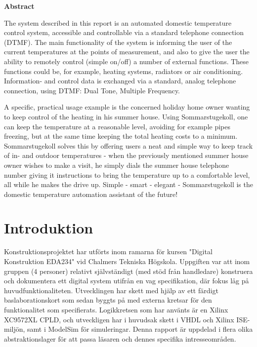 \documentclass[a4paper,11pt]{article}
\begin{document}
\begin{center}
	{\noindent \bf Abstract}
\end{center}

	The system described in this report is an automated domestic temperature control system, accessible and controllable via
	a standard telephone connection (DTMF). The main functionality of the system is informing the user of the current temperatures
	at the points of measurement, and also to give the user the ability to remotely control (simple on/off) a number of external
	functions. These functions could be, for example, heating systems, radiators or air conditioning. Information- and control data
	is exchanged via a standard, analog telephone connection, using DTMF: Dual Tone, Multiple Frequency.

	A specific, practical usage example is the concerned holiday home owner wanting to keep control of the heating in his summer house.
	Using Sommarstugekoll, one can keep the temperature at a reasonable level, avoiding for example pipes freezing, but at the same time
	keeping the total heating costs to a minimum. Sommarstugekoll solves this by offering users a neat and simple way to keep track
	of in- and outdoor temperatures - when the previously mentioned summer house owner wishes to make a visit, he simply dials the
	summer house telephone number giving it instructions to bring the temperature up to a comfortable level, all while he makes
	the drive up. Simple - smart - elegant - Sommarstugekoll is the domestic temperature automation assistant of the future!

\pagebreak

\section{Introduktion}

	Konstruktionsprojektet har utförts inom ramarna för kursen "Digital Konstruktion EDA234" vid Chalmers Tekniska Högskola.
	Uppgiften var att inom gruppen (4 personer) relativt självständigt (med stöd från handledare) konstruera och dokumentera
	ett digital system utifrån en vag specifikation, där fokus låg på huvudfunktionaliteten.
	Utvecklingen har skett med hjälp av ett färdigt baslaborationskort som sedan byggts på med externa kretsar för den funktionalitet
	som specifierats. Logikkretsen som har använts är en Xilinx XC9572XL CPLD, och utveckligen har i huvudsak skett i VHDL och Xilinx ISE-miljön,
	samt i ModelSim för simuleringar. Denna rapport är uppdelad i flera olika abstraktionslager för att passa läsaren och dennes specifika intresseområden. 
\end{document}
